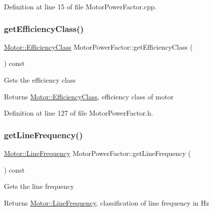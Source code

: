 Definition at line 15 of file Motor\+Power\+Factor.\+cpp.

\mbox{\label{class_motor_power_factor_a1ce98cb6ae9fbf09b05b4b6bd75e5c71}} 
\subsubsection{\texorpdfstring{get\+Efficiency\+Class()}{getEfficiencyClass()}}
{\footnotesize\ttfamily \hyperlink{class_motor_afa022971ae062406a9f588c601673d4e}{Motor\+::\+Efficiency\+Class} Motor\+Power\+Factor\+::get\+Efficiency\+Class (\begin{DoxyParamCaption}{ }\end{DoxyParamCaption}) const\hspace{0.3cm}{\ttfamily [inline]}}

Gets the efficiency class

\begin{DoxyReturn}{Returns}
\hyperlink{class_motor_afa022971ae062406a9f588c601673d4e}{Motor\+::\+Efficiency\+Class}, efficiency class of motor 
\end{DoxyReturn}


Definition at line 127 of file Motor\+Power\+Factor.\+h.

\mbox{\label{class_motor_power_factor_aa4cdc420b1f611bcb9f4a69c69c1fabf}} 
\subsubsection{\texorpdfstring{get\+Line\+Frequency()}{getLineFrequency()}}
{\footnotesize\ttfamily \hyperlink{class_motor_acee1bdf1b684ad36cb80dc2829d9fcee}{Motor\+::\+Line\+Frequency} Motor\+Power\+Factor\+::get\+Line\+Frequency (\begin{DoxyParamCaption}{ }\end{DoxyParamCaption}) const\hspace{0.3cm}{\ttfamily [inline]}}

Gets the line frequency

\begin{DoxyReturn}{Returns}
\hyperlink{class_motor_acee1bdf1b684ad36cb80dc2829d9fcee}{Motor\+::\+Line\+Frequency}, classification of line frequency in Hz 
\end{DoxyReturn}


